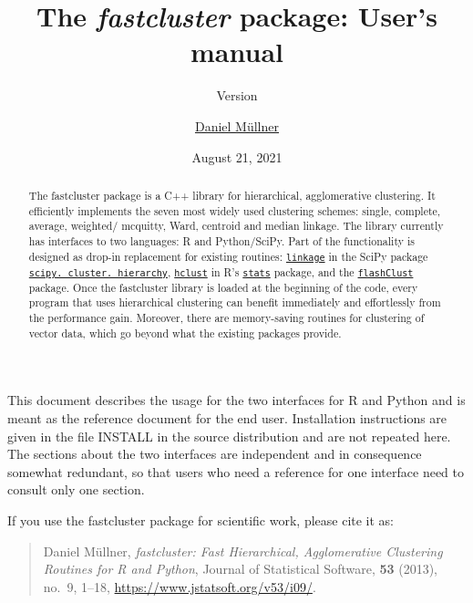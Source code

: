 \documentclass[fontsize=10pt,paper=letter,BCOR=-6mm,DIV=8]{scrartcl}
\newcommand*\linkage{\href{https://docs.scipy.org/doc/scipy/reference/generated/scipy.cluster.hierarchy.linkage.html}{\texttt{linkage}}}
\newcommand*\hierarchy{\href{https://docs.scipy.org/doc/scipy/reference/generated/scipy.cluster.hierarchy.linkage.html}{\texttt{scipy.\hskip0pt cluster.\hskip0pt hierarchy}}}
\newcommand*\hclust{\href{https://stat.ethz.ch/R-manual/R-patched/library/stats/html/hclust.html}{\texttt{hclust}}}
\newcommand*\stats{\href{https://stat.ethz.ch/R-manual/R-patched/library/stats/html/00Index.html}{\texttt{stats}}}
\newcommand*\flashClustPack{\href{https://CRAN.R-project.org/package=flashClust}{\texttt{flashClust}}}
\begin{document}
\title{The \textit{fastcluster} package: User's manual}
\author{\href{http://danifold.net}{Daniel Müllner}}
\date{August 21, 2021}
\subtitle{Version \fastclusterversion}
\maketitle

\makeatletter
\renewenvironment{quotation}{%
  \list{}{\listparindent 1em%
    \itemindent    \listparindent
    \leftmargin2.5em
    \rightmargin   \leftmargin
    \parsep        \z@ \@plus\p@
  }%
  \item\relax
}{%
  \endlist
}
\makeatother
\begin{abstract}\noindent\small
The fastcluster package is a C++ library for hierarchical, agglomerative
clustering. It efficiently implements the
seven most widely used clustering schemes: single, complete, average, weighted/\hskip0pt mcquitty, Ward, centroid and median linkage. The library currently has interfaces to two languages: R and Python/SciPy. Part of the functionality is designed as drop-in replacement for existing routines: \linkage{} in the SciPy package \hierarchy{}, \hclust{} in R's \stats{} package, and the \flashClustPack{} package. Once the fastcluster library is loaded at the beginning of the code, every program that uses hierarchical clustering can benefit immediately and effortlessly from the performance gain. Moreover, there are memory-saving routines for clustering of vector data, which go beyond what the existing packages provide.
\end{abstract}

\noindent
This document describes the usage for the two interfaces for R and Python and is meant as the reference document for the end user. Installation instructions are given in the file INSTALL in the source distribution and are not repeated here. The sections about the two interfaces are independent and in consequence somewhat redundant, so that users who need a reference for one interface need to consult only one section.

If you use the fastcluster package for scientific work, please cite it as:
\begin{quote}
Daniel Müllner, \textit{fastcluster: Fast Hierarchical, Agglomerative Clustering Routines for R and Python}, Journal of Statistical Software, \textbf{53} (2013), no.~9, 1--18, \url{https://www.jstatsoft.org/v53/i09/}.
\end{quote}
\end{document}
